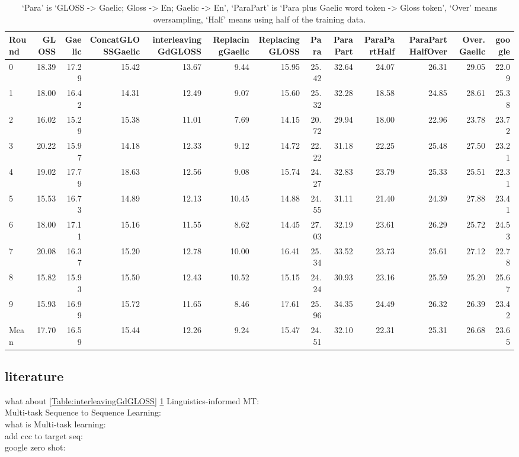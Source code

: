 \documentclass[a4paper]{article}
\begin{document}
\begin{table}[ht]
\centering
\begin{tabular}{lrrrrrrrrrrrr}
  \hline
Round & GLOSS & Gaelic & ConcatGLOSSGaelic & interleavingGdGLOSS & ReplacingGaelic & ReplacingGLOSS & Para & ParaPart & ParaPartHalf & ParaPartHalfOver & Over.Gaelic & google \\ 
  \hline
0 & 18.39 & 17.29 & 15.42 & 13.67 & 9.44 & 15.95 & 25.42 & 32.64 & 24.07 & 26.31 & 29.05 & 22.09 \\ 
  1 & 18.00 & 16.42 & 14.31 & 12.49 & 9.07 & 15.60 & 25.32 & 32.28 & 18.58 & 24.85 & 28.61 & 25.38 \\ 
  2 & 16.02 & 15.29 & 15.38 & 11.01 & 7.69 & 14.15 & 20.72 & 29.94 & 18.00 & 22.96 & 23.78 & 23.72 \\ 
  3 & 20.22 & 15.97 & 14.18 & 12.33 & 9.12 & 14.72 & 22.22 & 31.18 & 22.25 & 25.48 & 27.50 & 23.21 \\ 
  4 & 19.02 & 17.79 & 18.63 & 12.56 & 9.08 & 15.74 & 24.27 & 32.83 & 23.79 & 25.33 & 25.51 & 22.31 \\ 
  5 & 15.53 & 16.73 & 14.89 & 12.13 & 10.45 & 14.88 & 24.55 & 31.11 & 21.40 & 24.39 & 27.88 & 23.41 \\ 
  6 & 18.00 & 17.11 & 15.16 & 11.55 & 8.62 & 14.45 & 27.03 & 32.19 & 23.61 & 26.29 & 25.72 & 24.53 \\ 
  7 & 20.08 & 16.37 & 15.20 & 12.78 & 10.00 & 16.41 & 25.34 & 33.52 & 23.73 & 25.61 & 27.12 & 22.78 \\ 
  8 & 15.82 & 15.93 & 15.50 & 12.43 & 10.52 & 15.15 & 24.24 & 30.93 & 23.16 & 25.59 & 25.20 & 25.67 \\ 
  9 & 15.93 & 16.99 & 15.72 & 11.65 & 8.46 & 17.61 & 25.96 & 34.35 & 24.49 & 26.32 & 26.39 & 23.42 \\ 
   \hline
Mean & 17.70 & 16.59 & 15.44 & 12.26 & 9.24 & 15.47 & 24.51 & 32.10 & 22.31 & 25.31 & 26.68 & 23.65 \\ 
   \hline
\end{tabular}
\caption{`Para' is `GLOSS -> Gaelic; Gloss -> En; Gaelic -> En', `ParaPart' is `Para plus Gaelic word token -> Gloss token', `Over' means oversampling, `Half' means using half of the training data.} 
\label{table:complete_table}
\end{table}
\subsection{literature}

what about \ref{Table:interleavingGdGLOSS} \ref{table:complete_table}
Linguistics-informed MT: \citep{sennrich2016linguistic}\\ 

Multi-task Sequence to Sequence Learning: \citep{luong2015multi}\\
what is Multi-task learning:  \citep{Overview_Multi-Task_Learning}\\
add ccc to target seq: \citep{ccg_target_seq}\\
google zero shot: \citep{google_zero_shot}\\




\end{document}
